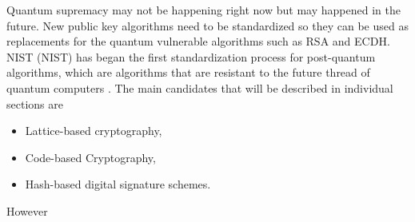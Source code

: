 Quantum supremacy may not be happening right now but may happened in the future. New public key algorithms need to be standardized so they can be used as replacements for the quantum vulnerable algorithms such as RSA and ECDH. NIST (\acl{NIST}) has began the first standardization process for post-quantum algorithms, which are algorithms that are resistant to the future thread of quantum computers \cite{Chen2016}. The main candidates that will be described  in individual sections are
\begin{itemize}
  \item Lattice-based cryptography,
  \item Code-based Cryptography,
  \item Hash-based digital signature schemes.
\end{itemize}

However
